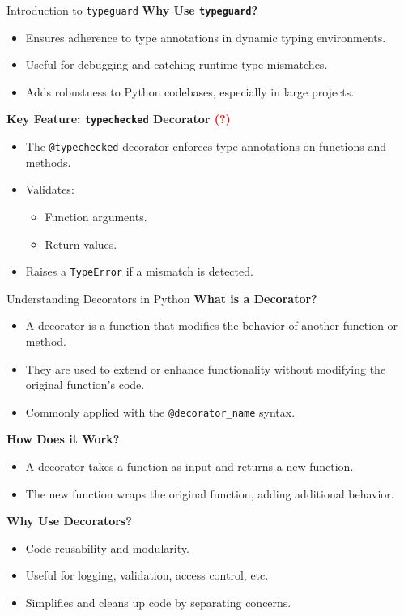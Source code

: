 \documentclass[10pt]{beamer}
\let\olditem\item
\renewcommand\item{\olditem\justifying}
\newcommand{\mypause}{\pause}
\begin{document}
	
	\begin{frame}{Introduction to \texttt{typeguard}}
		\textbf{Why Use \texttt{typeguard}\supercite{typeguardUserGuide}?}
		\begin{itemize}
			\item Ensures adherence to type annotations in dynamic typing environments.
			\item Useful for debugging and catching runtime type mismatches.
			\item Adds robustness to Python codebases, especially in large projects.
		\end{itemize}
		\mypause
		\textbf{Key Feature: \texttt{typechecked} Decorator \textcolor{red}{(?)}}
		\begin{itemize}
			\item The \texttt{@typechecked} decorator enforces type annotations on functions and methods.
			\item Validates:
			\begin{itemize}
				\item Function arguments.
				\item Return values.
			\end{itemize}
			\item Raises a \texttt{TypeError} if a mismatch is detected.
		\end{itemize}
	\end{frame}
	
	
	\begin{frame}{Understanding Decorators in Python}
		\textbf{What is a Decorator?}
		\begin{itemize}
			\item A decorator is a function that modifies the behavior of another function or method.
			\item They are used to extend or enhance functionality without modifying the original function's code.
			\item Commonly applied with the \texttt{@decorator\_name} syntax.
		\end{itemize}
		
		\textbf{How Does it Work?}
		\begin{itemize}
			\item A decorator takes a function as input and returns a new function.
			\item The new function wraps the original function, adding additional behavior.
		\end{itemize}
		
		\textbf{Why Use Decorators?}
		\begin{itemize}
			\item Code reusability and modularity.
			\item Useful for logging, validation, access control, etc.
			\item Simplifies and cleans up code by separating concerns.
		\end{itemize}
	\end{frame}
	
\end{document}
